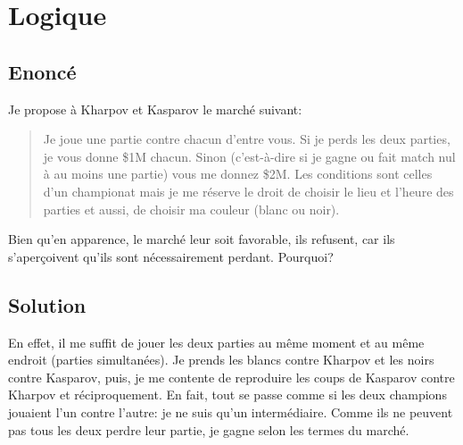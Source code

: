 \documentclass{article}
\newenvironment{statement}{\subsection{Enoncé}}{\pagebreak}
\newenvironment{solution}{\subsection{Solution}}{\pagebreak}
\begin{document}
\section{Logique}
\begin{statement}
Je propose à Kharpov et Kasparov le marché suivant:
\begin{quote}
Je joue une partie contre chacun d'entre vous. Si je perds les deux parties, je vous donne \$1M chacun. Sinon (c'est-à-dire si je gagne ou fait match nul à au moins une partie) vous me donnez \$2M. Les conditions sont celles d'un championat mais je me réserve le droit de choisir le lieu et l'heure des parties et aussi, de choisir ma couleur (blanc ou noir).
\end{quote}
Bien qu'en apparence, le marché leur soit favorable, ils refusent, car ils s'aperçoivent qu'ils sont
nécessairement perdant. Pourquoi?
\end{statement}
\begin{solution}
En effet, il me suffit de jouer les deux parties au même moment et au même endroit (parties simultanées). Je prends les blancs contre Kharpov et les noirs contre Kasparov, puis, je me contente de reproduire les coups de Kasparov contre Kharpov et réciproquement. En fait, tout se passe comme si les deux champions jouaient l'un contre l'autre: je ne suis qu'un intermédiaire. Comme ils ne peuvent pas tous les deux perdre leur partie, je gagne selon les termes du marché.
\end{solution}

\end{document}
